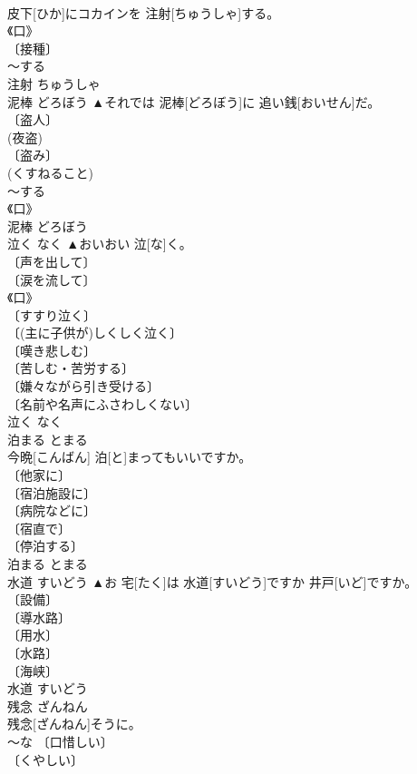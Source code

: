\documentclass[8pt]{extreport}
\begin{document}
\begin{CJK}{UTF8}{min}
\\	皮下[ひか]にコカインを 注射[ちゅうしゃ]する。	
\\	《口》 
\\	〔接種〕 
\\	～する 
\\	注射	ちゅうしゃ	
\\	泥棒	どろぼう	▲それでは 泥棒[どろぼう]に 追い銭[おいせん]だ。	
\\	〔盗人〕 
\\	(夜盗) 
\\	〔盗み〕 
\\	(くすねること) 
\\	～する 
\\	《口》 
\\	泥棒	どろぼう	
\\	泣く	なく	▲おいおい 泣[な]く。	
\\	〔声を出して〕 
\\	〔涙を流して〕 
\\	《口》 
\\	〔すすり泣く〕 
\\	〔(主に子供が)しくしく泣く〕 
\\	〔嘆き悲しむ〕 
\\	〔苦しむ・苦労する〕 
\\	〔嫌々ながら引き受ける〕 
\\	〔名前や名声にふさわしくない〕 
\\	泣く	なく	
\\	泊まる	とまる	
\\	今晩[こんばん] 泊[と]まってもいいですか。	
\\	〔他家に〕 
\\	〔宿泊施設に〕 
\\	〔病院などに〕 
\\	〔宿直で〕 
\\	〔停泊する〕 
\\	泊まる	とまる	
\\	水道	すいどう	▲お 宅[たく]は 水道[すいどう]ですか 井戸[いど]ですか。	
\\	〔設備〕 
\\	〔導水路〕 
\\	〔用水〕 
\\	〔水路〕 
\\	〔海峡〕 
\\	水道	すいどう	
\\	残念	ざんねん	
\\	残念[ざんねん]そうに。	
\\	～な 〔口惜しい〕 
\\	〔くやしい〕 

\end{CJK}
\end{document}
